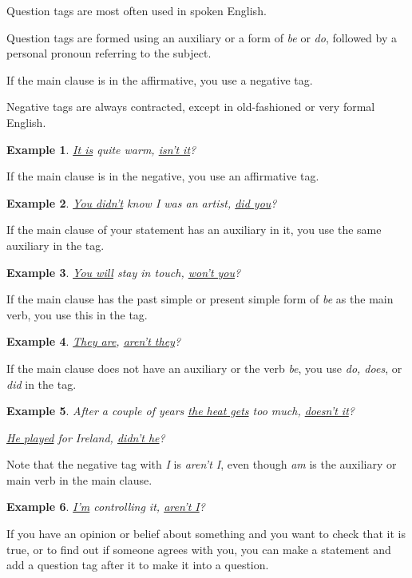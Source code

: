\documentclass[oneside]{book}
\numberwithin{equation}{section}
\newtheorem{example}{Example}[section]
\begin{document}
Question tags are most often used in spoken English.

%
\noindent{} Question tags are formed using an auxiliary or a form of \textit{be} or \textit{do}, followed by a personal pronoun referring to the subject.

%
If the main clause is in the affirmative, you use a negative tag.

Negative tags are always contracted, except in old-fashioned or very formal English.
\begin{example}
    \underline{It is} quite warm, \underline{isn't it}?
\end{example}
If the main clause is in the negative, you use an affirmative tag.
\begin{example}
    \underline{You didn't} know I was an artist, \underline{did you}?
\end{example}
If the main clause of your statement has an auxiliary in it, you use the same auxiliary in the tag.
\begin{example}
    \underline{You will} stay in touch, \underline{won't you}?
\end{example}
If the main clause has the past simple or present simple form of \textit{be} as the main verb, you use this in the tag.
\begin{example}
    \underline{They are}, \underline{aren't they}?
\end{example}
If the main clause does not have an auxiliary or the verb \textit{be}, you use \textit{do, does}, or \textit{did} in the tag.
\begin{example}
    After a couple of years \underline{the heat gets} too much, \underline{doesn't it}?
    
    \underline{He played} for Ireland, \underline{didn't he}?
\end{example}
Note that the negative tag with \textit{I} is \textit{aren't I}, even though \textit{am} is the auxiliary or main verb in the main clause.
\begin{example}
    \underline{I'm} controlling it, \underline{aren't I}?
\end{example}
%
\noindent{} If you have an opinion or belief about something and you want to check that it is true, or to find out if someone agrees with you, you can make a statement and add a question tag after it to make it into a question.
\end{document}
